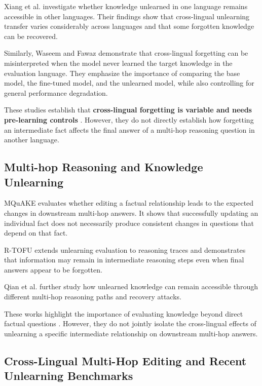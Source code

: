 \documentclass[10pt,a4paper]{article}
\begin{document}
Xiang et al. \cite{xiang2026multilingual} investigate
whether knowledge unlearned in one language remains
accessible in other languages. Their findings show that
cross-lingual unlearning transfer varies considerably
across languages and that some forgotten knowledge can
be recovered.

Similarly, Waseem and Fawaz
\cite{waseem2026falsepositive} demonstrate that
cross-lingual forgetting can be misinterpreted when
the model never learned the target knowledge in the
evaluation language. They emphasize the importance
of comparing the base model, the fine-tuned model,
and the unlearned model, while also controlling
for general performance degradation.

These studies establish that \textbf{cross-lingual forgetting is variable and needs pre-learning controls} \cite{xiang2026multilingual,waseem2026falsepositive}. However, they do not
directly establish how forgetting an intermediate
fact affects the final answer of a multi-hop
reasoning question in another language.

\subsection{Multi-hop Reasoning and Knowledge Unlearning}

MQuAKE \cite{zhong2023mquake} evaluates whether
editing a factual relationship leads to the expected
changes in downstream multi-hop answers. It shows
that successfully updating an individual fact does not necessarily produce consistent changes in questions that depend on that fact.

R-TOFU \cite{yoon2025rtofu} extends unlearning
evaluation to reasoning traces and demonstrates
that information may remain in intermediate reasoning
steps even when final answers appear to be forgotten.

Qian et al. \cite{qian2026leak} further study how unlearned knowledge can remain accessible through
different multi-hop reasoning paths and recovery attacks.

These works highlight the importance of evaluating
knowledge beyond direct factual questions \cite{yoon2025rtofu,qian2026leak}. However, they do not jointly isolate the cross-lingual effects of unlearning a specific intermediate relationship on downstream multi-hop answers.

\subsection{Cross-Lingual Multi-Hop Editing and Recent Unlearning Benchmarks}
\end{document}
